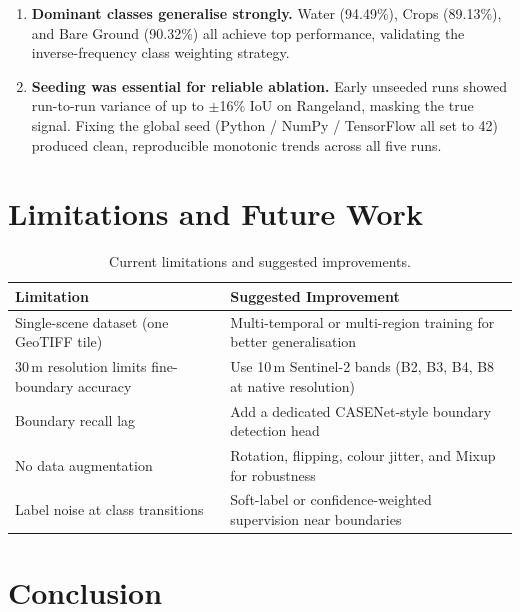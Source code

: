 \documentclass[12pt,a4paper]{article}
\begin{document}
\begin{enumerate}[leftmargin=*, label=\textbf{\arabic*.}]
  \item \textbf{Dominant classes generalise strongly.}
        Water (94.49\%), Crops (89.13\%), and Bare Ground (90.32\%) all
        achieve top performance, validating the inverse-frequency class
        weighting strategy.

  \item \textbf{Seeding was essential for reliable ablation.}
        Early unseeded runs showed run-to-run variance of up to
        $\pm$16\% IoU on Rangeland, masking the true signal. Fixing the
        global seed (Python / NumPy / TensorFlow all set to 42) produced
        clean, reproducible monotonic trends across all five runs.

\end{enumerate}

\section{Limitations and Future Work}

\begin{table}[H]
\centering
\caption{Current limitations and suggested improvements.}
\begin{tabularx}{\linewidth}{lX}
\toprule
\textbf{Limitation} & \textbf{Suggested Improvement} \\
\midrule
Single-scene dataset (one GeoTIFF tile) & Multi-temporal or multi-region training for better generalisation \\
30\,m resolution limits fine-boundary accuracy & Use 10\,m Sentinel-2 bands (B2, B3, B4, B8 at native resolution) \\
Boundary recall lag & Add a dedicated CASENet-style boundary detection head \\
No data augmentation & Rotation, flipping, colour jitter, and Mixup for robustness \\
Label noise at class transitions & Soft-label or confidence-weighted supervision near boundaries \\
\bottomrule
\end{tabularx}
\end{table}

\section{Conclusion}
\end{document}
